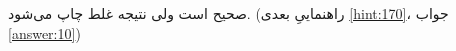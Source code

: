 \section{}
\paragraph{}\label{hint:16}
 صحیح است ولی نتیجه غلط چاپ می‌شود. (راهنماییِ بعدی \ref{hint:170}، جواب \ref{answer:10})